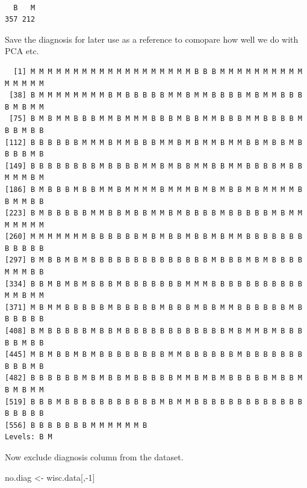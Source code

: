 \documentclass[
  letterpaper,
  DIV=11,
  numbers=noendperiod]{scrartcl}
\newenvironment{Shaded}{\begin{snugshade}}{\end{snugshade}}
\newcommand{\DecValTok}[1]{\textcolor[rgb]{0.68,0.00,0.00}{#1}}
\newcommand{\FunctionTok}[1]{\textcolor[rgb]{0.28,0.35,0.67}{#1}}
\newcommand{\NormalTok}[1]{\textcolor[rgb]{0.00,0.23,0.31}{#1}}
\newcommand{\OtherTok}[1]{\textcolor[rgb]{0.00,0.23,0.31}{#1}}
\newcommand{\SpecialCharTok}[1]{\textcolor[rgb]{0.37,0.37,0.37}{#1}}
\begin{document}
\begin{verbatim}

  B   M 
357 212 
\end{verbatim}

Save the diagnosis for later use as a reference to comopare how well we
do with PCA etc.

\begin{Shaded}
\end{Shaded}

\begin{verbatim}
  [1] M M M M M M M M M M M M M M M M M M M B B B M M M M M M M M M M M M M M M
 [38] B M M M M M M M M B M B B B B B M M B M M B B B B M B M M B B B B M B M M
 [75] B M B M M B B B M M B M M M B B B M B B M M B B B M M B B B B M B B M B B
[112] B B B B B B M M M B M M B B B M M B M B M M B M M B B M B B M B B B B M B
[149] B B B B B B B B M B B B B M M B M B B M M B B M M B B B B M B B M M M B M
[186] B M B B B M B B M M B M M M M B M M M B M B M B B M B M M M M B B M M B B
[223] B M B B B B B M M B B M B B M M B M B B B B M B B B B B M B M M M M M M M
[260] M M M M M M M B B B B B B M B M B B M B B M B M M B B B B B B B B B B B B
[297] B M B B M B M B B B B B B B B B B B B B B M B B B M B M B B B B M M M B B
[334] B B M B M B M B B B M B B B B B B B M M M B B B B B B B B B B B M M B M M
[371] M B M M B B B B B M B B B B B M B B B M B B M M B B B B B B M B B B B B B
[408] B M B B B B B M B B M B B B B B B B B B B B B M B M M B M B B B B B M B B
[445] M B M B B M B M B B B B B B B B M M B B B B B B M B B B B B B B B B B M B
[482] B B B B B B M B M B B M B B B B B M M B M B M B B B B B M B B M B M B M M
[519] B B B M B B B B B B B B B B B M B M M B B B B B B B B B B B B B B B B B B
[556] B B B B B B B M M M M M M B
Levels: B M
\end{verbatim}

Now exclude diagnosis column from the dataset.

\begin{Shaded}
\begin{Highlighting}[]
\NormalTok{no.diag }\OtherTok{\textless{}{-}}\NormalTok{ wisc.data[,}\SpecialCharTok{{-}}\DecValTok{1}\NormalTok{]}
\end{Highlighting}
\end{Shaded}
\end{document}
